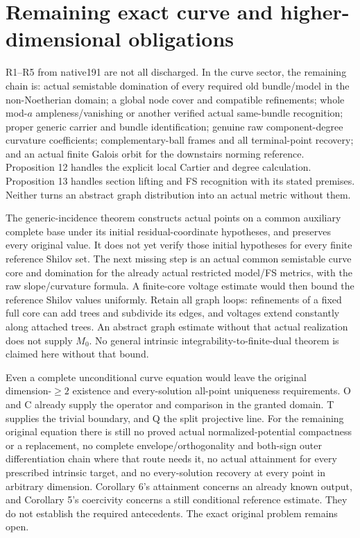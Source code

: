 \documentclass[
  11pt,
]{article}
\begin{document}
\section{Remaining exact curve and higher-dimensional
obligations}\label{remaining-exact-curve-and-higher-dimensional-obligations}

R1--R5 from native191 are not all discharged. In the curve sector, the
remaining chain is: actual semistable domination of every required old
bundle/model in the non-Noetherian domain; a global node cover and
compatible refinements; whole mod-\(a\) ampleness/vanishing or another
verified actual same-bundle recognition; proper generic carrier and
bundle identification; genuine raw component-degree curvature
coefficients; complementary-ball frames and all terminal-point recovery;
and an actual finite Galois orbit for the downstairs norming reference.
Proposition 12 handles the explicit local Cartier and degree
calculation. Proposition 13 handles section lifting and FS recognition
with its stated premises. Neither turns an abstract graph distribution
into an actual metric without them.

The generic-incidence theorem constructs actual points on a common
auxiliary complete base under its initial residual-coordinate
hypotheses, and preserves every original value. It does not yet verify
those initial hypotheses for every finite reference Shilov set. The next
missing step is an actual common semistable curve core and domination
for the already actual restricted model/FS metrics, with the raw
slope/curvature formula. A finite-core voltage estimate would then bound
the reference Shilov values uniformly. Retain all graph loops:
refinements of a fixed full core can add trees and subdivide its edges,
and voltages extend constantly along attached trees. An abstract graph
estimate without that actual realization does not supply \(M_0\). No
general intrinsic integrability-to-finite-dual theorem is claimed here
without that bound.

Even a complete unconditional curve equation would leave the original
dimension-\(\geq2\) existence and every-solution all-point uniqueness
requirements. O and C already supply the operator and comparison in the
granted domain. T supplies the trivial boundary, and Q the split
projective line. For the remaining original equation there is still no
proved actual normalized-potential compactness or a replacement, no
complete envelope/orthogonality and both-sign outer differentiation
chain where that route needs it, no actual attainment for every
prescribed intrinsic target, and no every-solution recovery at every
point in arbitrary dimension. Corollary 6's attainment concerns an
already known output, and Corollary 5's coercivity concerns a still
conditional reference estimate. They do not establish the required
antecedents. The exact original problem remains open.
\end{document}
